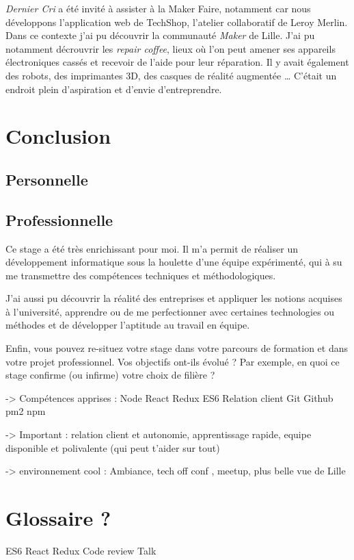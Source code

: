 \bigskip

\emph{Dernier Cri} a été invité à assister à la Maker Faire, notamment
car nous développons l'application web de TechShop, l'atelier
collaboratif de Leroy Merlin. Dans ce contexte j'ai pu découvrir la
communauté \emph{Maker} de Lille. J'ai pu notamment décrouvrir les
\emph{repair coffee}, lieux où l'on peut amener ses appareils
électroniques cassés et recevoir de l'aide pour leur réparation. Il y
avait également des robots, des imprimantes 3D, des casques de réalité
augmentée \ldots{} C'était un endroit plein d'aspiration et d'envie
d'entreprendre.

\newpage

\section{Conclusion}\label{conclusion-2}

\subsection{Personnelle}\label{personnelle}

\subsection{Professionnelle}\label{professionnelle}

Ce stage a été très enrichissant pour moi. Il m'a permit de réaliser un
développement informatique sous la houlette d'une équipe expérimenté,
qui à su me transmettre des compétences techniques et méthodologiques.

J'ai aussi pu découvrir la réalité des entreprises et appliquer les
notions acquises à l'université, apprendre ou de me perfectionner avec
certaines technologies ou méthodes et de développer l'aptitude au
travail en équipe.

Enfin, vous pouvez re-situez votre stage dans votre parcours de
formation et dans votre projet professionnel. Vos objectifs ont-ils
évolué ? Par exemple, en quoi ce stage confirme (ou infirme) votre choix
de filière ?

-\textgreater{} Compétences apprises : Node React Redux ES6 Relation
client Git Github pm2 npm

-\textgreater{} Important : relation client et autonomie, apprentissage
rapide, equipe disponible et polivalente (qui peut t'aider sur tout)

-\textgreater{} environnement cool : Ambiance, tech off conf , meetup,
plus belle vue de Lille

\newpage

\section{Glossaire ?}\label{glossaire}

ES6 React Redux Code review Talk
